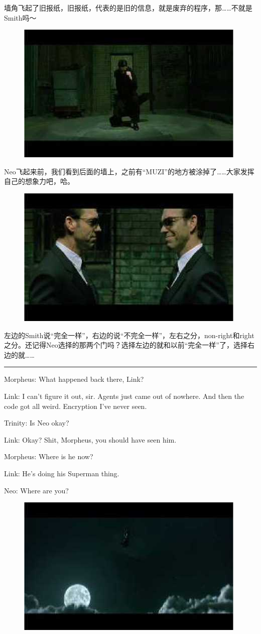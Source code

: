 \documentclass{ctexart}
\newcommand{\myparsep}{\noindent \rule[0.5ex]{\linewidth}{1pt}}
\newenvironment{myquote}{\color{green} \setlength{\leftskip}{6em} \setlength{\rightskip}{4em} \setlength{\parindent}{-2em}}{\par}
\begin{document}
墙角飞起了旧报纸，旧报纸，代表的是旧的信息，就是废弃的程序，那……不就是Smith吗～

\begin{figure}[htb]
\centering
\includegraphics[width=0.5\linewidth]{fig/read_reloaded-25}
\end{figure}

Neo飞起来前，我们看到后面的墙上，之前有“MUZI”的地方被涂掉了……大家发挥自己的想象力吧，哈。

\begin{figure}[htb]
\centering
\includegraphics[width=0.5\linewidth]{fig/read_reloaded-26}
\end{figure}

左边的Smith说“完全一样”，右边的说“不完全一样”，左右之分，non-right和right之分。还记得Neo选择的那两个门吗？选择左边的就和以前“完全一样”了，选择右边的就……

\myparsep

\begin{myquote}
Morpheus: What happened back there, Link?

Link: I can't figure it out, sir. Agents just came out of nowhere. And then the code got all weird. Encryption I've never seen.

Trinity: Is Neo okay?

Link: Okay? Shit, Morpheus, you should have seen him.

Morpheus: Where is he now?

Link: He's doing his Superman thing.

Neo: Where are you?
\end{myquote}

\begin{figure}[htb]
\centering
\includegraphics[width=0.5\linewidth]{fig/read_reloaded-27}
\end{figure}
\end{document}
